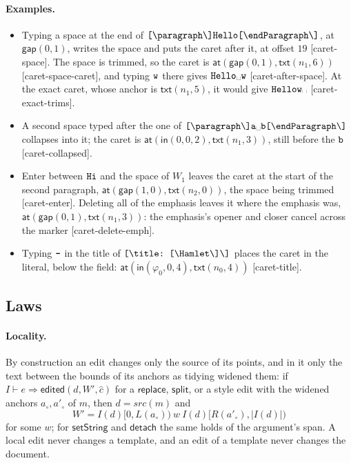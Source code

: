 \documentclass[11pt]{article}
\numberwithin{equation}{section}
\newcommand{\kw}[1]{\ensuremath{\mathsf{#1}}}
\newcommand{\str}[1]{\ensuremath{\text{\texttt{#1}}}}
\newcommand{\bs}{\textbackslash}
\newcommand{\vs}{\text{\textvisiblespace}}
\begin{document}
\paragraph{Examples.}
\begin{itemize}
\item Typing a space at the end of $\str{[\bs{}paragraph\bs]Hello[\bs{}endParagraph\bs]}$,
      at $\kw{gap}(0, 1)$, writes the space and puts the caret after it, at
      offset $19$ [caret-space].  The space is trimmed, so the caret is
      $\kw{at}(\kw{gap}(0, 1), \kw{txt}(n_1, 6))$ [caret-space-caret], and
      typing $\str{w}$ there gives $\str{Hello}\vs\str{w}$
      [caret-after-space].  At the exact caret, whose anchor is
      $\kw{txt}(n_1, 5)$, it would give $\str{Hellow}\vs$
      [caret-exact-trims].
\item A second space typed after the one of
      $\str{[\bs{}paragraph\bs]a}\vs\str{b[\bs{}endParagraph\bs]}$
      collapses into it; the caret is $\kw{at}(\kw{in}(0, 0, 2),
      \kw{txt}(n_1, 3))$, still before the $\str{b}$ [caret-collapsed].
\item Enter between $\str{Hi}$ and the space of $W_1$ leaves the caret at
      the start of the second paragraph, $\kw{at}(\kw{gap}(1, 0),
      \kw{txt}(n_2, 0))$, the space being trimmed [caret-enter].  Deleting
      all of the emphasis leaves it where the emphasis was,
      $\kw{at}(\kw{gap}(0, 1), \kw{txt}(n_1, 3))$: the emphasis's opener and
      closer cancel across the marker [caret-delete-emph].
\item Typing $\str{-}$ in the title of $\str{[\bs{}title:\ [\bs{}Hamlet\bs]\bs]}$
      places the caret in the literal, below the field: $\kw{at}(\kw{in}(\varphi_0, 0,
      4), \kw{txt}(n_0, 4))$ [caret-title].
\end{itemize}

\subsection{Laws}

\paragraph{Locality.}
By construction an edit changes only the source of its points, and in it
only the text between the bounds of its anchors as tidying widened them:
if $I \vdash e \Rightarrow \kw{edited}(d, W', \hat c)$ for a $\kw{replace}$,
$\kw{split}$, or a style edit with the widened anchors $a_\circ, a'_\circ$
of $m$, then $d = \mathit{src}(m)$ and
\begin{equation}\label{eq:law-locality}
W' = I(d)[0, \mathit{L}(a_\circ))\ w\ I(d)[\mathit{R}(a'_\circ), |I(d)|)
\end{equation}
for some $w$; for $\kw{setString}$ and $\kw{detach}$ the same holds of the
argument's span.  A local edit never changes a template, and an edit of a
template never changes the document.
\end{document}
